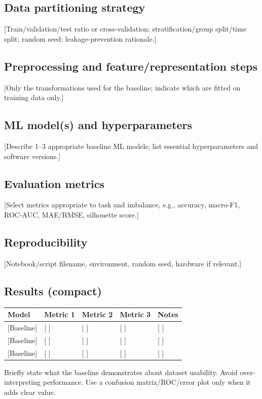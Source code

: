 \documentclass[11pt,a4paper]{article}
\begin{document}
\subsection{Data partitioning strategy}
[Train/validation/test ratio or cross-validation; stratification/group split/time split; random seed; leakage-prevention rationale.]

\subsection{Preprocessing and feature/representation steps}
[Only the transformations used for the baseline; indicate which are fitted on training data only.]

\subsection{ML model(s) and hyperparameters}
[Describe 1–3 appropriate baseline ML models; list essential hyperparameters and software versions.]

\subsection{Evaluation metrics}
[Select metrics appropriate to task and imbalance, e.g., accuracy, macro-F1, ROC-AUC, MAE/RMSE, silhouette score.]

\subsection{Reproducibility}
[Notebook/script filename, environment, random seed, hardware if relevant.]

\subsection{Results (compact)}
\noindent
\begin{tabularx}{\textwidth}{|p{3cm}|X|X|X|X|}
\hline
\textbf{Model} & \textbf{Metric 1} & \textbf{Metric 2} & \textbf{Metric 3} & \textbf{Notes} \\
\hline
{[Baseline]} & [ ] & [ ] & [ ] & [ ] \\
\hline
{[Baseline]} & [ ] & [ ] & [ ] & [ ] \\
\hline
{[Baseline]} & [ ] & [ ] & [ ] & [ ] \\
\hline
\end{tabularx}

\vspace{0.5em}
Briefly state what the baseline demonstrates about dataset usability. Avoid over-interpreting performance. Use a confusion matrix/ROC/error plot only when it adds clear value.
\end{document}
